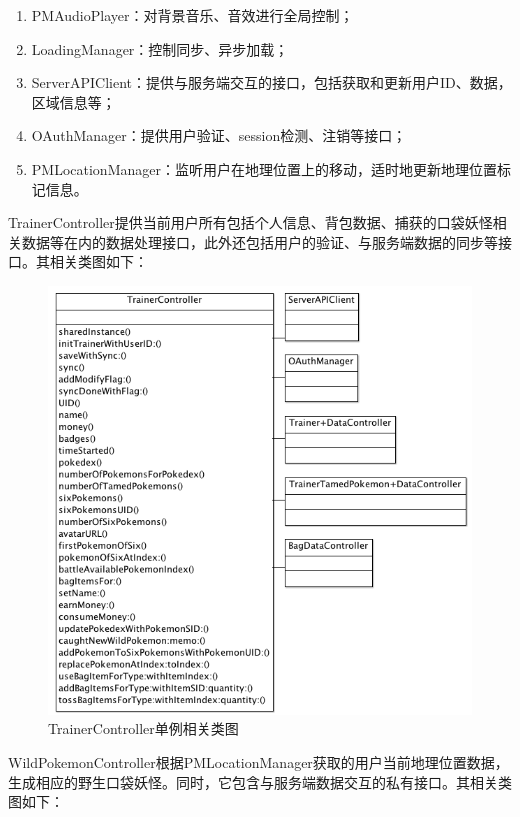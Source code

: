 \documentclass{article}
\begin{document}
\begin{CJK}{UTF8}{gbsn}
  \begin{enumerate}
		\item PMAudioPlayer：对背景音乐、音效进行全局控制；
		\item LoadingManager：控制同步、异步加载；
		\item ServerAPIClient：提供与服务端交互的接口，包括获取和更新用户ID、数据，区域信息等；
		\item OAuthManager：提供用户验证、session检测、注销等接口；
		\item PMLocationManager：监听用户在地理位置上的移动，适时地更新地理位置标记信息。
  \end{enumerate}

  TrainerController提供当前用户所有包括个人信息、背包数据、捕获的口袋妖怪相关数据等在内的数据处理接口，此外还包括用户的验证、与服务端数据的同步等接口。其相关类图如下：

  \begin{figure}[htbp]
		\centering
		\includegraphics[bb=0 0 604 615, scale=0.45]{figure/fig_n17.png}
		\caption{TrainerController单例相关类图}
		\label{fig:n17}
	\end{figure}

  WildPokemonController根据PMLocationManager获取的用户当前地理位置数据，生成相应的野生口袋妖怪。同时，它包含与服务端数据交互的私有接口。其相关类图如下：


\end{CJK}
\end{document}

